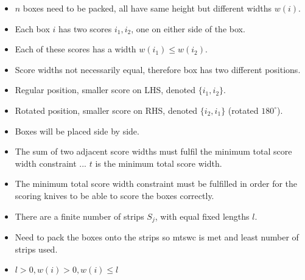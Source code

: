 \documentclass{llncs}
\begin{document}
\begin{itemize}
	\item $n$ boxes need to be packed, all have same height but different widths $w(i)$.
	\item Each box $i$ has two scores $i_1, i_2$, one on either side of the box.
	\item Each of these scores has a width $w(i_1) \leq w(i_2)$.
	\item Score widths not necessarily equal, therefore box has two different positions.
	\item Regular position, smaller score on LHS, denoted $\{i_1, i_2\}$.
	\item Rotated position, smaller score on RHS, denoted $\{i_2, i_1\}$ (rotated $180^{\circ}$).
	\item Boxes will be placed side by side.
	\item The sum of two adjacent score widths must fulfil the minimum total score width constraint ... $t$ is the minimum total score width.
	\item The minimum total score width constraint must be fulfilled in order for the scoring knives to be able to score the boxes correctly.
	\item There are a finite number of strips $S_j$, with equal fixed lengths $l$.
	\item Need to pack the boxes onto the strips so mtswc is met and least number of strips used.
	\item $l > 0, w(i) > 0, w(i) \leq l$
\end{itemize}
\end{document}
